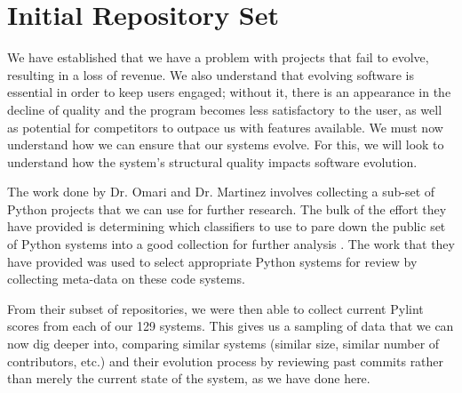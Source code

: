 \section{Initial Repository Set} \label{sectionInitialSet}

We have established that we have a problem with projects that fail to evolve, resulting in a loss of revenue. We also understand that evolving software is essential in order to keep users engaged; without it, there is an appearance in the decline of quality and the program becomes less satisfactory to the user, as well as potential for competitors to outpace us with features available. We must now understand how we can ensure that our systems evolve. For this, we will look to understand how the system's structural quality impacts software evolution.

The work done by Dr. Omari and Dr. Martinez involves collecting a sub-set of Python projects that we can use for further research. The bulk of the effort they have provided is determining which classifiers to use to pare down the public set of Python systems into a good collection for further analysis \cite{omari:2018}. The work that they have provided was used to select appropriate Python systems for review by collecting meta-data on these code systems.

From their subset of repositories, we were then able to collect current Pylint scores from each of our 129 systems. This gives us a sampling of data that we can now dig deeper into, comparing similar systems (similar size, similar number of contributors, etc.) and their evolution process by reviewing past commits rather than merely the current state of the system, as we have done here.
